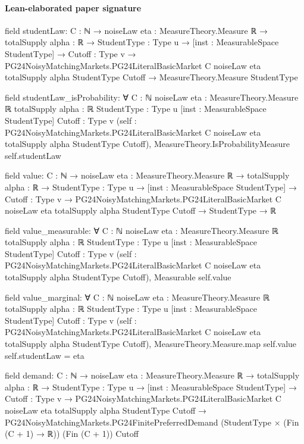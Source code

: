 \documentclass[10pt]{article}
\begin{document}
\paragraph{Lean-elaborated paper signature}
\begin{ReviewVerbatim}
field studentLaw:
{C : ℕ} →
  {noiseLaw eta : MeasureTheory.Measure ℝ} →
    {totalSupply alpha : ℝ} →
      {StudentType : Type u} →
        [inst : MeasurableSpace StudentType] →
          {Cutoff : Type v} →
            PG24NoisyMatchingMarkets.PG24LiteralBasicMarket C noiseLaw eta totalSupply alpha StudentType Cutoff →
              MeasureTheory.Measure StudentType

field studentLaw_isProbability:
∀ {C : ℕ} {noiseLaw eta : MeasureTheory.Measure ℝ} {totalSupply alpha : ℝ} {StudentType : Type u}
  [inst : MeasurableSpace StudentType] {Cutoff : Type v}
  (self : PG24NoisyMatchingMarkets.PG24LiteralBasicMarket C noiseLaw eta totalSupply alpha StudentType Cutoff),
  MeasureTheory.IsProbabilityMeasure self.studentLaw

field value:
{C : ℕ} →
  {noiseLaw eta : MeasureTheory.Measure ℝ} →
    {totalSupply alpha : ℝ} →
      {StudentType : Type u} →
        [inst : MeasurableSpace StudentType] →
          {Cutoff : Type v} →
            PG24NoisyMatchingMarkets.PG24LiteralBasicMarket C noiseLaw eta totalSupply alpha StudentType Cutoff →
              StudentType → ℝ

field value_measurable:
∀ {C : ℕ} {noiseLaw eta : MeasureTheory.Measure ℝ} {totalSupply alpha : ℝ} {StudentType : Type u}
  [inst : MeasurableSpace StudentType] {Cutoff : Type v}
  (self : PG24NoisyMatchingMarkets.PG24LiteralBasicMarket C noiseLaw eta totalSupply alpha StudentType Cutoff),
  Measurable self.value

field value_marginal:
∀ {C : ℕ} {noiseLaw eta : MeasureTheory.Measure ℝ} {totalSupply alpha : ℝ} {StudentType : Type u}
  [inst : MeasurableSpace StudentType] {Cutoff : Type v}
  (self : PG24NoisyMatchingMarkets.PG24LiteralBasicMarket C noiseLaw eta totalSupply alpha StudentType Cutoff),
  MeasureTheory.Measure.map self.value self.studentLaw = eta

field demand:
{C : ℕ} →
  {noiseLaw eta : MeasureTheory.Measure ℝ} →
    {totalSupply alpha : ℝ} →
      {StudentType : Type u} →
        [inst : MeasurableSpace StudentType] →
          {Cutoff : Type v} →
            PG24NoisyMatchingMarkets.PG24LiteralBasicMarket C noiseLaw eta totalSupply alpha StudentType Cutoff →
              PG24NoisyMatchingMarkets.PG24FinitePreferredDemand (StudentType × (Fin (C + 1) → ℝ)) (Fin (C + 1)) Cutoff


\end{ReviewVerbatim}
\end{document}
